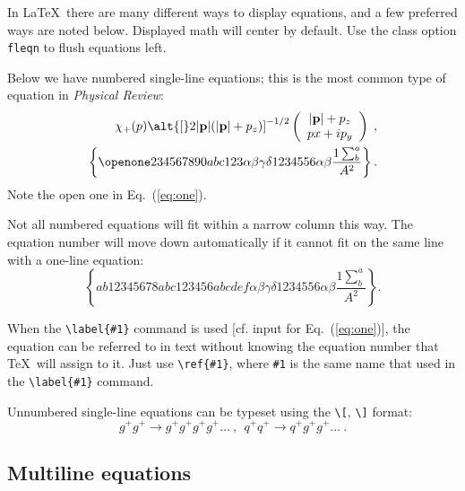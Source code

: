 \documentclass[%
 reprint,
 amsmath,amssymb,
 aps,
]{revtex4-2}
\begin{document}
  In \LaTeX\ there are many different ways to display equations, and a
  few preferred ways are noted below. Displayed math will center by
  default. Use the class option \verb+fleqn+ to flush equations left.

  Below we have numbered single-line equations; this is the most common
  type of equation in \textit{Physical Review}:
  \begin{eqnarray}
  \chi_+(p)\alt{\bf [}2|{\bf p}|(|{\bf p}|+p_z){\bf ]}^{-1/2}
  \left(
  \begin{array}{c}
  |{\bf p}|+p_z\\
  px+ip_y
  \end{array}\right)\;,
  \\
  \left\{%
  \openone234567890abc123\alpha\beta\gamma\delta1234556\alpha\beta
  \frac{1\sum^{a}_{b}}{A^2}%
  \right\}%
  \label{eq:one}.
  \end{eqnarray}
  Note the open one in Eq.~(\ref{eq:one}).

  Not all numbered equations will fit within a narrow column this
  way. The equation number will move down automatically if it cannot fit
  on the same line with a one-line equation:
  \begin{equation}
  \left\{
  ab12345678abc123456abcdef\alpha\beta\gamma\delta1234556\alpha\beta
  \frac{1\sum^{a}_{b}}{A^2}%
  \right\}.
  \end{equation}

  When the \verb+\label{#1}+ command is used [cf. input for
  Eq.~(\ref{eq:one})], the equation can be referred to in text without
  knowing the equation number that \TeX\ will assign to it. Just
  use \verb+\ref{#1}+, where \verb+#1+ is the same name that used in
  the \verb+\label{#1}+ command.

  Unnumbered single-line equations can be typeset
  using the \verb+\[+, \verb+\]+ format:
  \[g^+g^+ \rightarrow g^+g^+g^+g^+ \dots ~,~~q^+q^+\rightarrow
  q^+g^+g^+ \dots ~. \]


  \subsection{Multiline equations}
\end{document}
